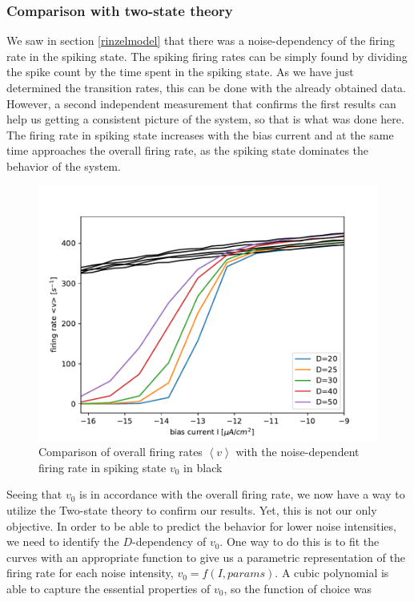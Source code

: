 \documentclass[12pt,a4paper]{article}
\begin{document}
\subsubsection{Comparison with two-state theory}
We saw in section \ref{rinzelmodel} that there was a noise-dependency of the firing rate in the spiking state. The spiking firing rates can be simply found by dividing the spike count by the time spent in the spiking state. As we have just determined the transition rates, this can be done with the already obtained data. However, a second independent measurement that confirms the first results can help us getting a consistent picture of the system, so that is what was done here. \\
The firing rate in spiking state increases with the bias current and at the same time approaches the overall firing rate, as the spiking state dominates the behavior of the system. 
\begin{figure}[H]
	\centering
	\includegraphics[scale=1]{detmocountrinzelcompnew2.pdf}\caption{Comparison of overall firing rates $\left<v\right>$ with the noise-dependent firing rate in spiking state $v_0$ in black}
	\label{detmocomp}
\end{figure}
Seeing that $v_0$ is in accordance with the overall firing rate, we now have a way to utilize the Two-state theory to confirm our results. Yet, this is not our only objective. In order to be able to predict the behavior for lower noise intensities, we need to identify the $D$-dependency of $v_0$.
One way to do this is to fit the curves with an appropriate function to give us a parametric representation of the firing rate for each noise intensity, $v_0=f(I,params)$. A cubic polynomial is able to capture the essential properties of $v_0$, so the function of choice was 
\end{document}
